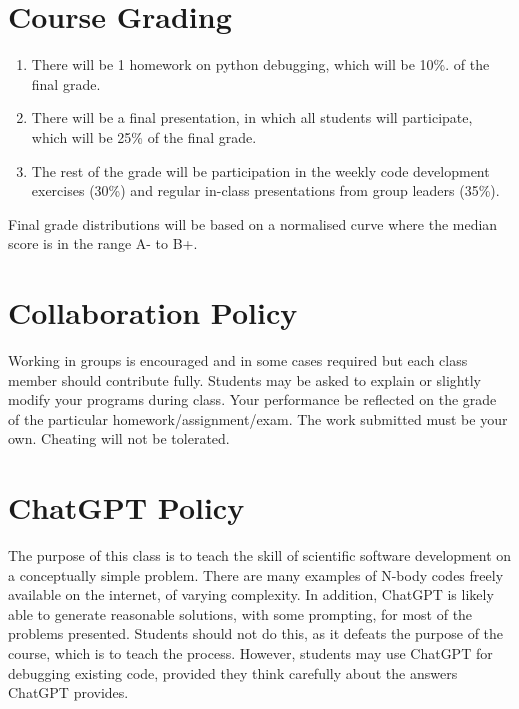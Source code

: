 \documentclass[12pt]{article}
\begin{document}
\section{Course Grading}

\begin{enumerate}
 \item There will be 1 homework on python debugging, which will be 10\%. of the final grade.
\item There will be a final presentation, in which all students will participate, which will be 25\% of the final grade.
\item The rest of the grade will be participation in the weekly code development exercises (30\%) and regular in-class presentations from group leaders (35\%).
\end{enumerate}

Final grade distributions will be based on a normalised curve where the median score is in the range A- to B+.


\section{Collaboration Policy}

Working in groups is encouraged and in some cases required but each class member should contribute fully. Students may be asked to explain or slightly modify your programs during class. Your performance be reflected on the grade of the particular homework/assignment/exam. The work submitted must be your own. Cheating will not be tolerated.

\section{ChatGPT Policy}

The purpose of this class is to teach the skill of scientific software development on a conceptually simple problem. There are many examples of N-body codes freely available on the internet, of varying complexity. In addition, ChatGPT is likely able to generate reasonable solutions, with some prompting, for most of the problems presented. Students should not do this, as it defeats the purpose of the course, which is to teach the process. However, students may use ChatGPT for debugging existing code, provided they think carefully about the answers ChatGPT provides.


%
%
%
%
%
%
\end{document}
